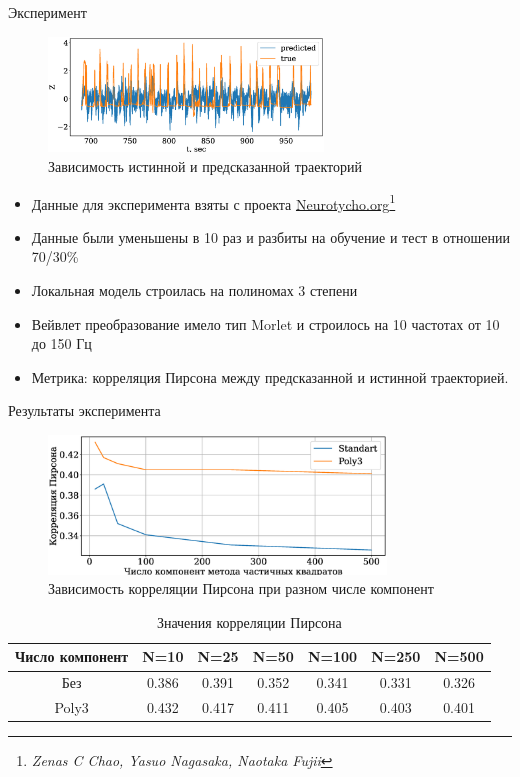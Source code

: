 \documentclass[9pt,pdf,hyperref={unicode}]{beamer}
\begin{document}
\begin{frame}{Эксперимент}
\begin{figure}
	\includegraphics[width=0.65\textwidth]{figs/pre.eps}
	\caption{Зависимость истинной и предсказанной траекторий}
\end{figure}
\begin{itemize}
	\item Данные для эксперимента взяты с проекта \href{http://neurotycho.org/epidural-ecog-food-tracking-task}{Neurotycho.org}\footnote[2]{\textit{Zenas C Chao, Yasuo Nagasaka, Naotaka Fujii}} 
	\item Данные были уменьшены в 10 раз и разбиты на обучение и тест в отношении 70/30\%
	\item Локальная модель строилась на полиномах 3 степени
	\item Вейвлет преобразование имело тип Morlet и строилось на 10 частотах от 10 до 150 Гц
	\item Метрика: корреляция Пирсона между предсказанной и истинной траекторией.
\end{itemize}
\end{frame}
\begin{frame}{Результаты эксперимента}
\begin{figure}
	\includegraphics[width=0.8\textwidth]{figs/com.eps}
	\caption{Зависимость корреляции Пирсона при разном числе компонент}
\end{figure}
\begin{table}[]
	\caption{Значения корреляции Пирсона}
	\begin{tabular}{|c|c|c|c|c|c|c|}
		\hline
		Число компонент & N=10  & N=25  & N=50  & N=100 & N=250 & N=500 \\ \hline
		Без             & 0.386 & 0.391 & 0.352 & 0.341 & 0.331 & 0.326 \\ \hline
		Poly3           & 0.432 & 0.417 & 0.411 & 0.405 & 0.403 & 0.401 \\ \hline
	\end{tabular}
\end{table}
\end{frame}
\end{document}
